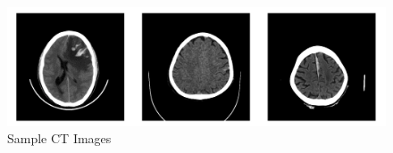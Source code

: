 \begin{figure}
    \centerline{\includegraphics[width=1\columnwidth]{02-related-works/figures/sample-ct-images.png}}
    \caption{Sample CT Images \cite{chilamkurthy2018deep}}
    \label{figure:sample-ct-images}
\end{figure}